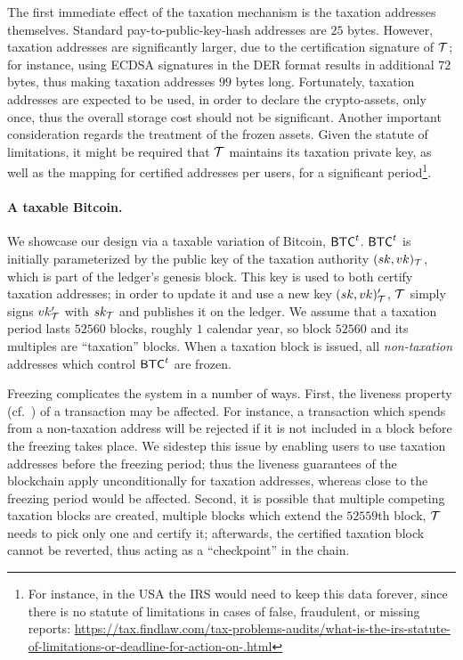 The first immediate effect of the taxation mechanism is the taxation addresses
themselves. Standard pay-to-public-key-hash
addresses are $25$ bytes.
However, taxation addresses are significantly larger, due to the certification
signature of $\mathcal{T}$; for instance, using ECDSA signatures in the DER format
results in additional $72$ bytes, thus making taxation addresses $99$ bytes
long. Fortunately, taxation addresses are expected to be used, in order to
declare the crypto-assets, only once, thus the overall storage cost should not
be significant.
Another important consideration regards the treatment of the frozen assets.
Given the statute of limitations, it might be required that
$\mathcal{T}$ maintains its taxation private key, as well as the mapping for
certified addresses per users, for a significant period\footnote{For
instance, in the USA the IRS would need to keep this data forever, since there
is no statute of limitations in cases of false, fraudulent, or missing reports:
\url{https://tax.findlaw.com/tax-problems-audits/what-is-the-irs-statute-of-limitations-or-deadline-for-action-on-.html}}.

\paragraph{A taxable Bitcoin.}

We showcase our design via a taxable variation of Bitcoin, $\mathsf{BTC}^{t}$. $\mathsf{BTC}^{t}$
is initially parameterized by the public key of the taxation authority
$(sk, vk)_\mathcal{T}$, which is part of the ledger's genesis block. This key is
used to both certify taxation addresses; in order to update it and use a new
key $(sk, vk)_\mathcal{T}'$, $\mathcal{T}$ simply signs $vk_\mathcal{T}'$ with
$sk_\mathcal{T}$ and publishes it on the ledger.
We assume that a taxation period lasts $52560$ blocks, \ie roughly $1$ calendar
year, so block $52560$ and its multiples are ``taxation'' blocks.  When a
taxation block is issued, all \emph{non-taxation} addresses which control
$\mathsf{BTC}^{t}$ are frozen.

Freezing complicates the system in a number of ways.
First, the liveness property (cf.~\cite{EC:GarKiaLeo15}) of a transaction may
be affected. For instance, a transaction which spends from a non-taxation
address will be rejected if it is not included in a block before the freezing
takes place. We sidestep this issue by enabling users to use taxation addresses
before the freezing period; thus the liveness guarantees of the blockchain
apply unconditionally for taxation addresses, whereas close to the freezing
period would be affected. Second, it is possible that multiple competing
taxation blocks are created, \eg multiple blocks which extend the $52559$th
block, $\mathcal{T}$ needs to pick only one and certify it; afterwards, the
certified taxation block cannot be reverted, thus acting as a ``checkpoint'' in
the chain.

